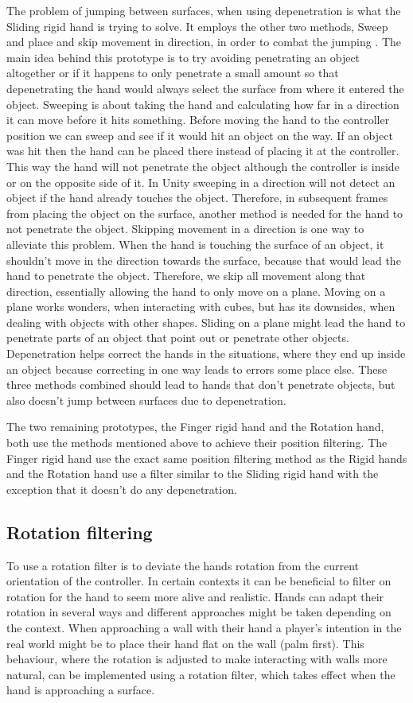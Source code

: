 The problem of jumping between surfaces, when using depenetration is what the Sliding rigid hand is trying to solve. It employs the other two methods, Sweep and place and skip movement in direction, in order to combat the jumping . The main idea behind this prototype is to try avoiding penetrating an object altogether or if it happens to only penetrate a small amount so that depenetrating the hand would always select the surface from where it entered the object. Sweeping is about taking the hand and calculating how far in a direction it can move before it hits something. Before moving the hand to the controller position we can sweep and see if it would hit an object on the way. If an object was hit then the hand can be placed there instead of placing it at the controller. This way the hand will not penetrate the object although the controller is inside or on the opposite side of it. In Unity sweeping in a direction will not detect an object if the hand already touches the object. Therefore, in subsequent frames from placing the object on the surface, another method is needed for the hand to not penetrate the object. Skipping movement in a direction is one way to alleviate this problem. When the hand is touching the surface of an object, it shouldn't move in the direction towards the surface, because that would lead the hand to penetrate the object. Therefore, we skip all movement along that direction, essentially allowing the hand to only move on a plane. Moving on a plane works wonders, when interacting with cubes, but has its downsides, when dealing with objects with other shapes. Sliding on a plane might lead the hand to penetrate parts of an object that point out or penetrate other objects. Depenetration helps correct the hands in the situations, where they end up inside an object because correcting in one way leads to errors some place else. These three methods combined should lead to hands that don't penetrate objects, but also doesn't jump between surfaces due to depenetration.

The two remaining prototypes, the Finger rigid hand and the Rotation hand, both use the methods mentioned above to achieve their position filtering. The Finger rigid hand use the exact same position filtering method as the Rigid hands and the Rotation hand use a filter similar to the Sliding rigid hand with the exception that it doesn't do any depenetration.

\subsection{Rotation filtering}
\label{subsec:categoryRotationFiltering}
To use a rotation filter is to deviate the hands rotation from the current orientation of the controller. In certain contexts it can be beneficial to filter on rotation for the hand to seem more alive and realistic. Hands can adapt their rotation in several ways and different approaches might be taken depending on the context. When approaching a wall with their hand a player's intention in the real world might be to place their hand flat on the wall (palm first). This behaviour, where the rotation is adjusted to make interacting with walls more natural, can be implemented using a rotation filter, which takes effect when the hand is approaching a surface.

